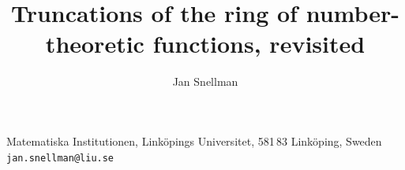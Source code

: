 \documentclass[a4paper,11pt,oneside,reqno]{amsart}
\theoremstyle{definition}
\theoremstyle{remark}
\theoremstyle{plain}
\begin{document}
\title[Truncations revisited]{Truncations of the ring of number-theoretic
  functions, revisited}
\author{Jan Snellman }
\address{Matematiska Institutionen, Linköpings Universitet, 581 83 Linköping, Sweden}
\makeatletter
\let\addresses\@empty
\makeatother
\maketitle

\begin{center}
  \small
  Matematiska Institutionen, Linköpings Universitet, 581\,83 Linköping, Sweden\\
  \texttt{jan.snellman@liu.se}
\end{center}
\end{document}
